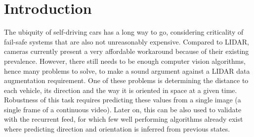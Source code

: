 \chapter{Introduction}
\label{chap:intro}

The ubiquity of self-driving cars has a long way to go, considering criticality of fail-safe systems that are also not unreasonably expensive. Compared to LIDAR, cameras currently present a very affordable workaround because of their existing prevalence. However, there still needs to be enough computer vision algorithms, hence many problems to solve, to make a sound argument against a LIDAR data augmentation requirement. One of these problems is determining the distance to each vehicle, its direction and the way it is oriented in space at a given time. Robustness of this task requires predicting these values from a single image (a single frame of a continuous video). Later on, this can be also used to validate with the recurrent feed, for which few well performing algorithms already exist where predicting direction and orientation is inferred from previous states.